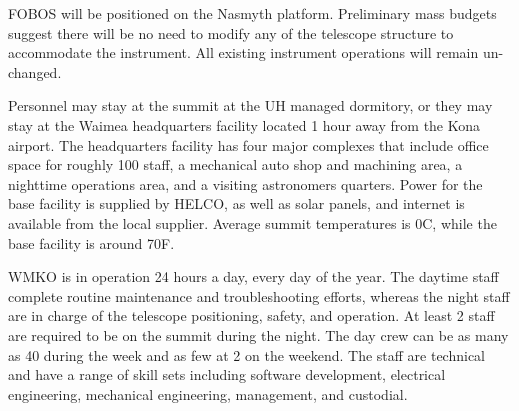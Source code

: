 \documentclass[oneside,11pt]{amsart}
\begin{document}
FOBOS will be positioned on the Nasmyth platform. Preliminary mass
budgets suggest there will be no need to modify any of the telescope
structure to accommodate the instrument. All existing instrument
operations will remain un-changed.

Personnel may stay at the summit at the UH managed dormitory, or they
may stay at the Waimea headquarters facility located 1 hour away from
the Kona airport. The headquarters facility has four major complexes
that include office space for roughly 100 staff, a mechanical auto
shop and machining area, a nighttime operations area, and a visiting
astronomers quarters. Power for the base facility is supplied by
HELCO, as well as solar panels, and internet is available from the
local supplier. Average summit temperatures is 0C, while the base
facility is around 70F.


WMKO is in operation 24 hours a day, every day of the year. The
daytime staff complete routine maintenance and troubleshooting
efforts, whereas the night staff are in charge of the telescope
positioning, safety, and operation. At least 2 staff are required to
be on the summit during the night. The day crew can be as many as 40
during the week and as few at 2 on the weekend. The staff are
technical and have a range of skill sets including software
development, electrical engineering, mechanical engineering,
management, and custodial.



\end{document}
